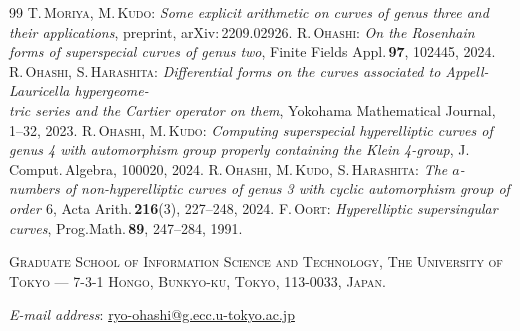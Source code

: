 \documentclass{article}
\theoremstyle{definition}
\begin{document}
\begin{thebibliography}{99}
 \textsc{T\hspace{-0.3mm}.\,Moriya, M\hspace{-0.1mm}.\,Kudo}: \textit{Some explicit arithmetic on curves of genus three and their applications}, preprint, arXiv:\,2209.02926.\vspace{-1mm}
 \textsc{R.\,Ohashi}: \textit{On the Rosenhain forms of superspecial curves of genus two}, Finite \hspace{-0.1mm}Fields \hspace{-0.2mm}Appl.\,{\bf 97}, 102445, 2024.\vspace{-1mm}
 \textsc{R.\,Ohashi, S.\,Harashita}: \textit{Differential forms on the curves associated to Appell-Lauricella hypergeome-\\tric series and the Cartier operator on them}, Yokohama Mathematical Journal\hspace{1mm}{\bf 69}, 1--32, 2023.\vspace{-1mm}
 \textsc{R.\,Ohashi, M\hspace{-0.2mm}.\,Kudo}: \textit{Computing superspecial hyperelliptic curves of genus 4 with automorphism group properly containing the Klein 4-group}, J.\,Comput.\,Algebra\hspace{1mm}{\bf 11}, 100020, 2024.\vspace{-1mm}
 \textsc{R.\,Ohashi, M\hspace{-0.2mm}.\,Kudo, S.\,Harashita}: \textit{The $a$-numbers of non-hyperelliptic curves of genus 3 with cyclic automorphism group of order $6$}, Acta Arith.\,{\bf 216}(3), 227--248, 2024.\vspace{-1mm}
 \textsc{F\hspace{-0.2mm}.\,Oort}: \textit{Hyperelliptic supersingular curves}, Prog.\hspace{0.8mm}Math.\,{\bf 89}, 247--284, 1991.\vspace{-1mm}
\end{thebibliography}\vspace{2.3mm}

\textsc{Graduate School of Information Science and Technology, The
University of Tokyo — 7-3-1 Hongo, Bunkyo-ku, Tokyo, 113-0033, Japan.}\par
\textit{E-mail address}: \url{ryo-ohashi@g.ecc.u-tokyo.ac.jp}
\end{document}
